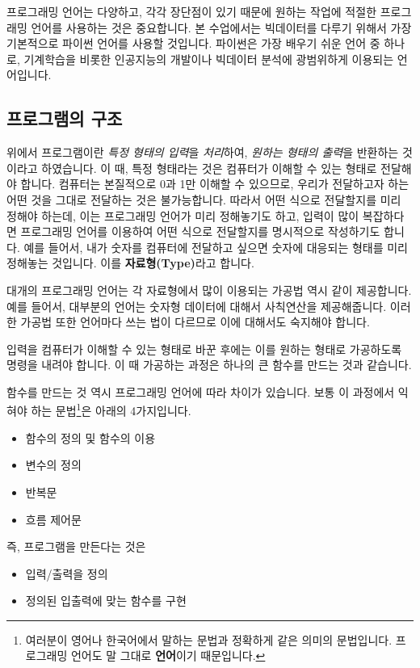 \documentclass[twoside]{article}
\begin{document}
프로그래밍 언어는 다양하고, 각각 장단점이 있기 때문에 원하는 작업에 적절한 프로그래밍 언어를 사용하는 것은 중요합니다. 본 수업에서는 빅데이터를 다루기 위해서 가장 기본적으로 파이썬 언어를 사용할 것입니다. 파이썬은 가장 배우기 쉬운 언어 중 하나로, 기계학습을 비롯한 인공지능의 개발이나 빅데이터 분석에 광범위하게 이용되는 언어입니다. 

\subsection{프로그램의 구조} 

위에서 프로그램이란 \textit{특정 형태의 입력}을 \textit{처리}하여, \textit{원하는 형태의 출력}을 반환하는 것이라고 하였습니다. 이 때, 특정 형태라는 것은 컴퓨터가 이해할 수 있는 형태로 전달해야 합니다. 컴퓨터는 본질적으로 0과 1만 이해할 수 있으므로, 우리가 전달하고자 하는 어떤 것을 그대로 전달하는 것은 불가능합니다. 따라서 어떤 식으로 전달할지를 미리 정해야 하는데, 이는 프로그래밍 언어가 미리 정해놓기도 하고, 입력이 많이 복잡하다면 프로그래밍 언어를 이용하여 어떤 식으로 전달할지를 명시적으로 작성하기도 합니다. 예를 들어서, 내가 숫자를 컴퓨터에 전달하고 싶으면 숫자에 대응되는 형태를 미리 정해놓는 것입니다. 이를 \textbf{자료형(Type)}라고 합니다.

대개의 프로그래밍 언어는 각 자료형에서 많이 이용되는 가공법 역시 같이 제공합니다. 예를 들어서, 대부분의 언어는 숫자형 데이터에 대해서 사칙연산을 제공해줍니다. 이러한 가공법 또한 언어마다 쓰는 법이 다르므로 이에 대해서도 숙지해야 합니다. 

입력을 컴퓨터가 이해할 수 있는 형태로 바꾼 후에는 이를 원하는 형태로 가공하도록 명령을 내려야 합니다. 이 때 가공하는 과정은 하나의 큰 함수를 만드는 것과 같습니다. 


함수를 만드는 것 역시 프로그래밍 언어에 따라 차이가 있습니다. 보통 이 과정에서 익혀야 하는 문법\footnote{여러분이 영어나 한국어에서 말하는 문법과 정확하게 같은 의미의 문법입니다. 프로그래밍 언어도 말 그대로 \textbf{언어}이기 때문입니다.}은 아래의 4가지입니다. 

\begin{itemize} 
\item 함수의 정의 및 함수의 이용 
\item 변수의 정의 
\item 반복문 
\item 흐름 제어문 
\end{itemize}

즉, 프로그램을 만든다는 것은 
\begin{itemize} 
\item 입력/출력을 정의 
\item 정의된 입출력에 맞는 함수를 구현
\end{itemize}
\end{document}
